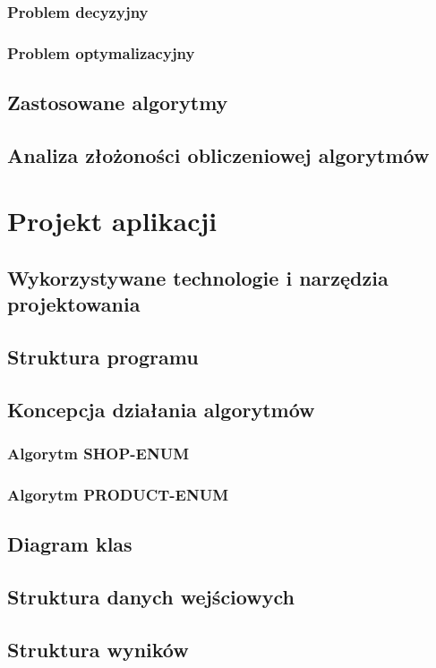 \documentclass[a4paper]{article}
\let\oldsection\section
\renewcommand\section{\clearpage\oldsection}
\begin{document}
\subsubsection{Problem decyzyjny}
\subsubsection{Problem optymalizacyjny}
\subsection{Zastosowane algorytmy}
\subsection{Analiza złożoności obliczeniowej algorytmów}

\section{Projekt aplikacji}
\subsection{Wykorzystywane technologie i narzędzia projektowania}
\subsection{Struktura programu}
\subsection{Koncepcja działania algorytmów}
\subsubsection{Algorytm SHOP-ENUM}
\subsubsection{Algorytm PRODUCT-ENUM}
\subsection{Diagram klas}
\subsection{Struktura danych wejściowych}
\subsection{Struktura wyników}
\end{document}
